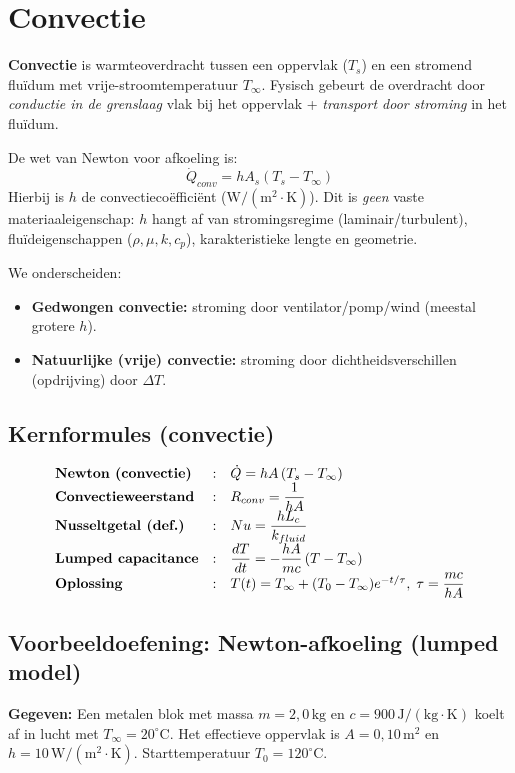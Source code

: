\documentclass[a4paper,11pt,twoside]{report}
\begin{document}
\section{Convectie}
	\textbf{Convectie} is warmteoverdracht tussen een oppervlak ($T_s$) en een stromend fluïdum met vrije-stroomtemperatuur $T_\infty$. Fysisch gebeurt de overdracht door \textit{conductie in de grenslaag} vlak bij het oppervlak + \textit{transport door stroming} in het fluïdum.

De wet van Newton voor afkoeling is:
\[
\dot{Q}_{conv} = h A_s (T_s - T_{\infty})
\]
Hierbij is $h$ de convectiecoëfficiënt ($\mathrm{W/(m^2\cdot K)}$). Dit is \textit{geen} vaste materiaaleigenschap: $h$ hangt af van stromingsregime (laminair/turbulent), fluïdeigenschappen ($\rho,\mu,k,c_p$), karakteristieke lengte en geometrie.

We onderscheiden:
\begin{itemize}
    \item \textbf{Gedwongen convectie:} stroming door ventilator/pomp/wind (meestal grotere $h$).
    \item \textbf{Natuurlijke (vrije) convectie:} stroming door dichtheidsverschillen (opdrijving) door $\Delta T$.
\end{itemize}

\subsection*{Kernformules (convectie)}
\begingroup
\setlength{\tabcolsep}{6pt}
\renewcommand{\arraystretch}{1.35}
\[
\begin{array}{@{}lcl@{}}
    	\textbf{Newton (convectie)} &:& \dot{Q}=hA\,(T_s-T_\infty)\\
    	\textbf{Convectieweerstand} &:& R_{conv}=\dfrac{1}{hA}\\
    	\textbf{Nusseltgetal (def.)} &:& Nu=\dfrac{hL_c}{k_{fluid}}\\
    	\textbf{Lumped capacitance} &:& \dfrac{dT}{dt}=-\dfrac{hA}{mc}\,(T-T_\infty)\\
    	\textbf{Oplossing} &:& T(t)=T_\infty+(T_0-T_\infty)e^{-t/\tau},\;\tau=\dfrac{mc}{hA}\\
\end{array}
\]
\endgroup

\subsection*{Voorbeeldoefening: Newton-afkoeling (lumped model)}
        	\textbf{Gegeven:} Een metalen blok met massa $m=2{,}0\,\mathrm{kg}$ en $c=900\,\mathrm{J/(kg\cdot K)}$ koelt af in lucht met $T_\infty=20^\circ\mathrm{C}$. Het effectieve oppervlak is $A=0{,}10\,\mathrm{m^2}$ en $h=10\,\mathrm{W/(m^2\cdot K)}$. Starttemperatuur $T_0=120^\circ\mathrm{C}$.
\end{document}

